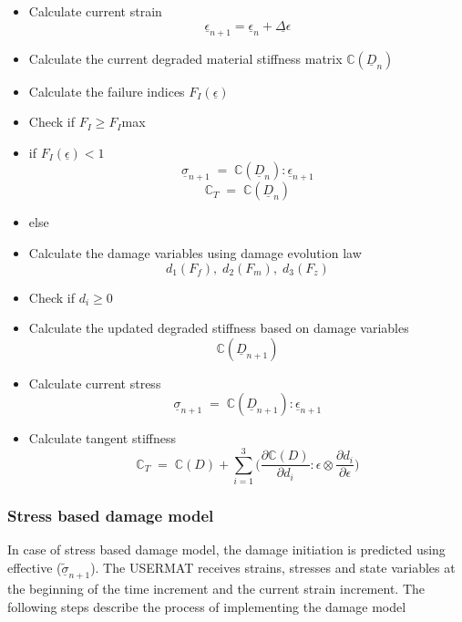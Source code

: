 \documentclass[a4paper,12pt]{extarticle}
\begin{document}
\begin{itemize}
\item Calculate current strain \textbf{$$ \underline{\epsilon}_{n+1} = \underline{\epsilon}_{n} + \underline{\Delta \epsilon} $$}
\item Calculate the current degraded material stiffness matrix  \textbf{$\mathbb{C}(\underline{D}_{n})$}
\item Calculate the failure indices \textbf{$F_{I}(\underline{\epsilon})$}
\item[] Check if $F_{I} \geq F_{I}$max
\item if \textbf{$F_{I}(\underline{\epsilon})<1$} \textbf{$$\underline{\sigma}_{n+1} \; = \; \mathbb{C}(\underline{D}_{n}) :  \underline{\epsilon}_{n+1} $$} \textbf{$$\mathbb{C}_{T} \; = \; \mathbb{C}(\underline{D}_{n})$$}
\item else
   	
\item[]  Calculate the damage variables using damage evolution law \textbf{$$d_{1}(F_{f}),\;d_{2}(F_{m}),\;d_{3}(F_{z})$$}
\item[]  Check if $d_{i} \geq 0 $ 
\item[]  Calculate the updated degraded stiffness based on damage variables \textbf{$$\mathbb{C}(\underline{D}_{n+1})$$}
\item[]  Calculate current stress  \textbf{$$\underline{\sigma}_{n+1} \; = \; \mathbb{C}(\underline{D}_{n+1}) :  \underline{\epsilon}_{n+1} $$}
\item[] Calculate tangent stiffness \textbf{$$\mathbb{C}_{T}  \; = \;\mathbb{C}(D) + \sum_{i = 1}^{3} \Big( \frac{\partial \mathbb{C}(D) }{\partial d_{i}} : \epsilon \otimes \frac{\partial d_{i}}{\partial \epsilon }\Big)$$}
	
\end{itemize} 

\newpage
\subsubsection{Stress based damage model}
\indent\indent\indent  In case of stress based damage model, the damage initiation is predicted using effective ($\underline{\tilde{\sigma}}_{n+1}$).  The USERMAT receives strains, stresses and state variables at the beginning of the time increment and the current strain increment. The following steps describe the process of implementing the damage model
\end{document}
